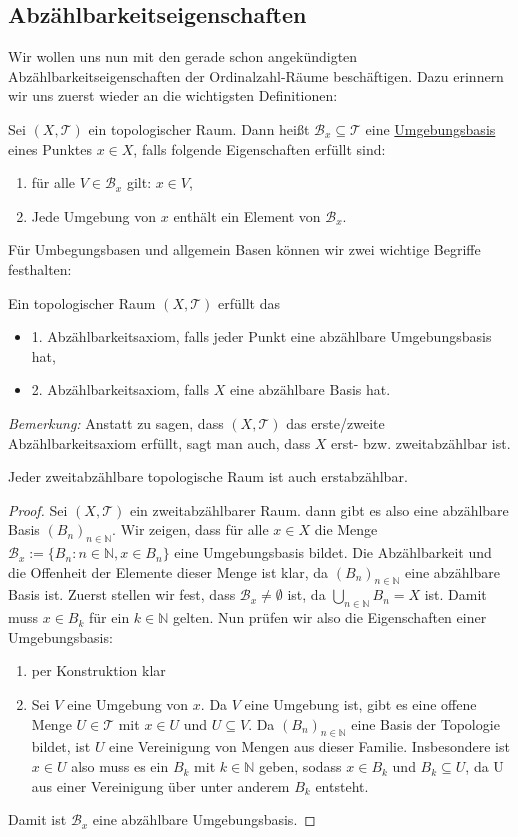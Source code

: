 \documentclass[11pt]{scrartcl}
\begin{document}
\subsection{Abzählbarkeitseigenschaften}
Wir wollen uns nun mit den gerade schon angekündigten Abzählbarkeitseigenschaften der Ordinalzahl-Räume
beschäftigen. Dazu erinnern wir uns zuerst wieder an die wichtigsten Definitionen:
\begin{definition}
	Sei $(X,\mathcal T)$  ein topologischer Raum. 
	Dann heißt $\mathcal B_x \subseteq \mathcal T$ 
	eine \underline{Umgebungsbasis} eines Punktes $x\in X$, falls folgende Eigenschaften erfüllt
	sind:
	\begin{enumerate}
		\item für alle $V\in \mathcal B_x$ gilt: $x\in V$,
		\item Jede Umgebung von $x$ enthält ein Element von $\mathcal B_x$.
	\end{enumerate}
\end{definition}
Für Umbegungsbasen und allgemein Basen können wir zwei wichtige Begriffe festhalten:
\begin{definition}
	Ein topologischer Raum $(X,\mathcal T)$ erfüllt das \begin{itemize}
		\item 1. Abzählbarkeitsaxiom, falls jeder Punkt eine abzählbare Umgebungsbasis hat,
		\item 2. Abzählbarkeitsaxiom, falls $X$ eine abzählbare Basis hat.
	\end{itemize}
\end{definition}
\noindent \textit{Bemerkung:} Anstatt zu sagen, dass $(X,\mathcal T)$ das erste/zweite 
Abzählbarkeitsaxiom erfüllt, sagt man auch, dass $X$ erst- bzw. zweitabzählbar ist.
\begin{lemma}
	Jeder zweitabzählbare topologische Raum ist auch erstabzählbar.
\end{lemma}
\begin{proof}
	Sei $(X,\mathcal T)$ ein zweitabzählbarer Raum. dann gibt es also 
	eine abzählbare Basis $(B_n)_{n\in\mathbb N}$. Wir zeigen, dass für alle $x\in X$ die Menge
	$\mathcal B_x:=\{B_n: n\in \mathbb N, x\in B_n\}$ eine Umgebungsbasis bildet. Die Abzählbarkeit und die Offenheit der Elemente
	dieser Menge ist klar, da $(B_n)_{n\in\mathbb N}$ eine abzählbare Basis ist. Zuerst stellen wir fest, dass $\mathcal B_x\neq\emptyset$ ist,
	da $\bigcup_{n\in\mathbb N} B_n=X$ ist. Damit muss $x\in B_k$ für ein $k\in\mathbb N$ gelten. Nun prüfen wir also 
	die Eigenschaften einer Umgebungsbasis:
	\begin{enumerate}
		\item per Konstruktion klar
		\item Sei $V$ eine Umgebung von $x$. Da $V$ eine Umgebung ist, gibt es eine offene
			Menge $U\in\mathcal T$ mit $x\in U$ und $U\subseteq V$. Da 
			$(B_n)_{n\in\mathbb N}$ eine Basis der Topologie bildet, ist $U$ eine 
			Vereinigung von Mengen aus dieser Familie. Insbesondere ist $x\in U$ also
			muss es ein $B_k$ mit $k\in \mathbb N$ geben, sodass $x\in B_k$ und 
			$B_k\subseteq U$, da U aus einer Vereinigung über unter anderem $B_k$ entsteht.
	\end{enumerate}
	Damit ist $\mathcal B_x$ eine abzählbare Umgebungsbasis.
\end{proof}
\end{document}
